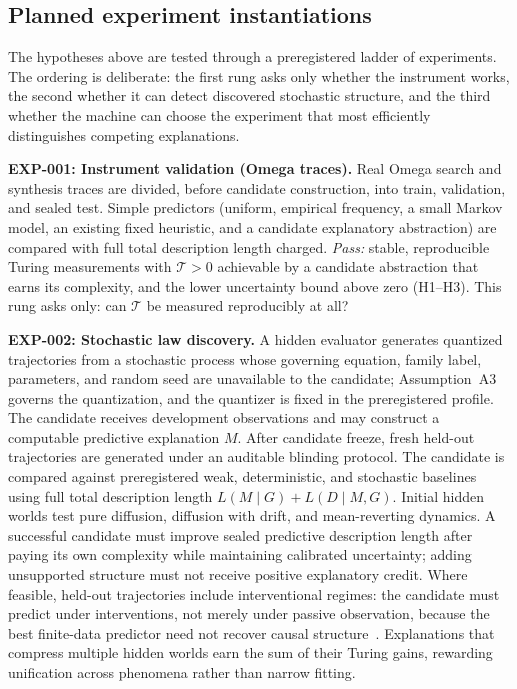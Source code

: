 \documentclass[11pt]{article}
\begin{document}
\subsection{Planned experiment instantiations}

The hypotheses above are tested through a preregistered ladder of experiments. The ordering is deliberate: the first rung asks only whether the instrument works, the second whether it can detect discovered stochastic structure, and the third whether the machine can choose the experiment that most efficiently distinguishes competing explanations.

\textbf{EXP-001: Instrument validation (Omega traces).} Real Omega search and synthesis traces are divided, before candidate construction, into train, validation, and sealed test. Simple predictors (uniform, empirical frequency, a small Markov model, an existing fixed heuristic, and a candidate explanatory abstraction) are compared with full total description length charged. \textit{Pass:} stable, reproducible Turing measurements with \(\mathcal{T}>0\) achievable by a candidate abstraction that earns its complexity, and the lower uncertainty bound above zero (H1--H3). This rung asks only: can \(\mathcal{T}\) be measured reproducibly at all?

\textbf{EXP-002: Stochastic law discovery.} A hidden evaluator generates quantized trajectories from a stochastic process whose governing equation, family label, parameters, and random seed are unavailable to the candidate; Assumption~A3 governs the quantization, and the quantizer is fixed in the preregistered profile. The candidate receives development observations and may construct a computable predictive explanation \(M\). After candidate freeze, fresh held-out trajectories are generated under an auditable blinding protocol. The candidate is compared against preregistered weak, deterministic, and stochastic baselines using full total description length \(L(M\mid G)+L(D\mid M,G)\). Initial hidden worlds test pure diffusion, diffusion with drift, and mean-reverting dynamics. A successful candidate must improve sealed predictive description length after paying its own complexity while maintaining calibrated uncertainty; adding unsupported structure must not receive positive explanatory credit. Where feasible, held-out trajectories include interventional regimes: the candidate must predict under interventions, not merely under passive observation, because the best finite-data predictor need not recover causal structure~\cite{shmueli2010}. Explanations that compress multiple hidden worlds earn the sum of their Turing gains, rewarding unification across phenomena rather than narrow fitting.
\end{document}
